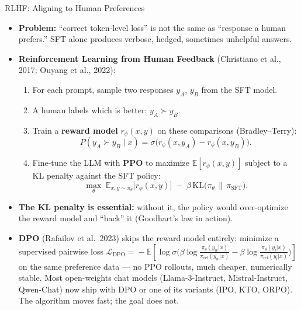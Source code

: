 \begin{frame}{RLHF: Aligning to Human Preferences}
\begin{itemize}
\item \textbf{Problem:} ``correct token-level loss'' is not the same as ``response a human prefers.'' SFT alone produces verbose, hedged, sometimes unhelpful answers.

\medskip
\item \textbf{Reinforcement Learning from Human Feedback} (Christiano et al., 2017; Ouyang et al., 2022):
\begin{enumerate}
\item For each prompt, sample two responses $y_A$, $y_B$ from the SFT model.
\item A human labels which is better: $y_A \succ y_B$.
\item Train a \textbf{reward model} $r_\phi(x, y)$ on these comparisons (Bradley--Terry):
\[
P(y_A \succ y_B \mid x) = \sigma\bigl(r_\phi(x, y_A) - r_\phi(x, y_B)\bigr).
\]
\item Fine-tune the LLM with \textbf{PPO} to maximize $\mathbb{E}[r_\phi(x, y)]$ subject to a KL penalty against the SFT policy:
\[
\max_\theta \; \mathbb{E}_{x, y \sim \pi_\theta}\bigl[r_\phi(x, y)\bigr]
\;-\; \beta\, \mathrm{KL}\bigl(\pi_\theta \,\|\, \pi_{\text{SFT}}\bigr).
\]
\end{enumerate}

\medskip
\item \textbf{The KL penalty is essential:} without it, the policy would over-optimize the reward model and ``hack'' it (Goodhart's law in action).

\medskip
\item \textbf{DPO} (Rafailov et al.\ 2023) skips the reward model entirely: minimize a supervised pairwise loss
$\mathcal{L}_{\text{DPO}} \!=\! -\mathbb{E}\!\left[\log\sigma\!\bigl(\beta\log\tfrac{\pi_\theta(y_w|x)}{\pi_{\text{ref}}(y_w|x)} - \beta\log\tfrac{\pi_\theta(y_l|x)}{\pi_{\text{ref}}(y_l|x)}\bigr)\right]$
on the same preference data --- no PPO rollouts, much cheaper, numerically stable. Most open-weights chat models (Llama-3-Instruct, Mistral-Instruct, Qwen-Chat) now ship with DPO or one of its variants (IPO, KTO, ORPO). The algorithm moves fast; the goal does not.
\end{itemize}
\end{frame}

